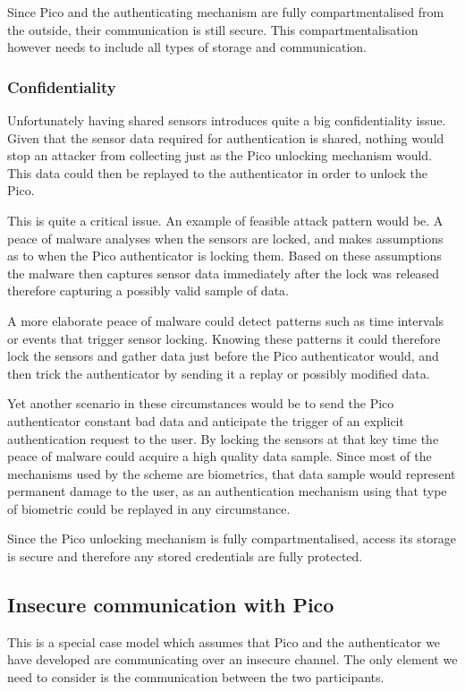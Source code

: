 	Since Pico and the authenticating mechanism are fully compartmentalised from the outside, their communication is still secure. This compartmentalisation however needs to include all types of storage and communication.

	\subsubsection*{Confidentiality}
	Unfortunately having shared sensors introduces quite a big confidentiality issue. Given that the sensor data required for authentication is shared, nothing would stop an attacker from collecting just as the Pico unlocking mechanism would. This data could then be replayed to the authenticator in order to unlock the Pico. 
	
	This is quite a critical issue. An example of feasible attack pattern would be. A peace of malware analyses when the sensors are locked, and makes assumptions as to when the Pico authenticator is locking them. Based on these assumptions the malware then captures sensor data immediately after the lock was released therefore capturing a possibly valid sample of data. 
	
	A more elaborate peace of malware could detect patterns such as time intervals or events that trigger sensor locking. Knowing these patterns it could therefore lock the sensors and gather data just before the Pico authenticator would, and then trick the authenticator by sending it a replay or possibly modified data.
	
	Yet another scenario in these circumstances would be to send the Pico authenticator constant bad data and anticipate the trigger of an explicit authentication request to the user. By locking the sensors at that key time the peace of malware could acquire a high quality data sample. Since most of the mechanisms used by the scheme are biometrics, that data sample would represent permanent damage to the user, as an authentication mechanism using that type of biometric could be replayed in any circumstance. 
	
	Since the Pico unlocking mechanism is fully compartmentalised, access its storage is secure and therefore any stored credentials are fully protected.

\subsection{Insecure communication with Pico}
This is a special case model which assumes that Pico and the authenticator we have developed are communicating over an insecure channel. The only element we need to consider is the communication between the two participants.

